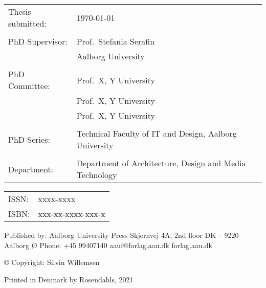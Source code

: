 \thispagestyle{empty}
\noindent
\fontsize{9.5}{12}\selectfont %
\begin{tabularx}{\textwidth}{@{}lX}
    Thesis submitted: & \today\\
    \\
    PhD Supervisor: & Prof.\ Stefania Serafin\\
                    & Aalborg University\\
                    \\
    PhD Committee: & Prof.\ X, Y University\\
                   & Prof.\ X, Y University\\
                   & Prof.\ X, Y University\\
                   \\
    PhD Series:    & Technical Faculty of IT and Design, Aalborg University\\
    \\
    Department: & Department of Architecture, Design and Media Technology
\end{tabularx}
\normalsize
\strut\vfill
\noindent
\begin{tabularx}{\textwidth}{@{}lX}
    ISSN: & xxxx-xxxx\\
    ISBN: & xxx-xx-xxxx-xxx-x\\
\end{tabularx}
\strut\vfill
\noindent Published by:\newline
Aalborg University Press\newline
Skjernvej 4A, 2nd floor\newline
DK – 9220 Aalborg Ø\newline
Phone: +45 99407140\newline
aauf@forlag.aau.dk\newline
forlag.aau.dk
\strut\vfill
\noindent \copyright{} Copyright: Silvin Willemsen\newline
\strut\vfill
\noindent Printed in Denmark by Rosendahls, 2021
\clearpage

